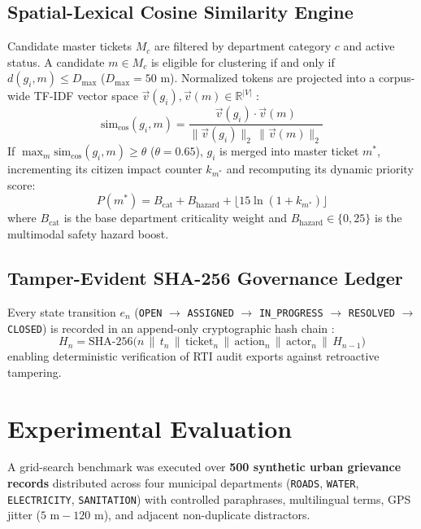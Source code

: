 \documentclass[conference]{IEEEtran}
\begin{document}
\subsection{Spatial-Lexical Cosine Similarity Engine}
Candidate master tickets $M_c$ are filtered by department category $c$ and active status. A candidate $m \in M_c$ is eligible for clustering if and only if $d(g_i, m) \le D_{\max}$ ($D_{\max} = 50\text{ m}$). Normalized tokens are projected into a corpus-wide TF-IDF vector space $\vec{v}(g_i), \vec{v}(m) \in \mathbb{R}^{|V|}$ \cite{salton1988term, ramos2003using, manning2008introduction}:
\begin{equation}
\text{sim}_{\text{cos}}(g_i, m) = \frac{\vec{v}(g_i) \cdot \vec{v}(m)}{\|\vec{v}(g_i)\|_2 \, \|\vec{v}(m)\|_2}
\end{equation}
If $\max_{m} \text{sim}_{\text{cos}}(g_i, m) \ge \theta$ ($\theta = 0.65$), $g_i$ is merged into master ticket $m^*$, incrementing its citizen impact counter $k_{m^*}$ and recomputing its dynamic priority score:
\begin{equation}
P(m^*) = B_{\text{cat}} + B_{\text{hazard}} + \lfloor 15 \ln(1 + k_{m^*}) \rfloor
\end{equation}
where $B_{\text{cat}}$ is the base department criticality weight and $B_{\text{hazard}} \in \{0, 25\}$ is the multimodal safety hazard boost.

\subsection{Tamper-Evident SHA-256 Governance Ledger}
Every state transition $e_n$ (\texttt{OPEN} $\rightarrow$ \texttt{ASSIGNED} $\rightarrow$ \texttt{IN\_PROGRESS} $\rightarrow$ \texttt{RESOLVED} $\rightarrow$ \texttt{CLOSED}) is recorded in an append-only cryptographic hash chain \cite{nakamoto2008bitcoin}:
\begin{equation}
H_n = \text{SHA-256}\big(n \,\|\, t_n \,\|\, \text{ticket}_n \,\|\, \text{action}_n \,\|\, \text{actor}_n \,\|\, H_{n-1}\big)
\end{equation}
enabling deterministic verification of RTI audit exports against retroactive tampering.

\section{Experimental Evaluation}
A grid-search benchmark was executed over \textbf{500 synthetic urban grievance records} distributed across four municipal departments (\texttt{ROADS}, \texttt{WATER}, \texttt{ELECTRICITY}, \texttt{SANITATION}) with controlled paraphrases, multilingual terms, GPS jitter ($5\text{ m} - 120\text{ m}$), and adjacent non-duplicate distractors.
\end{document}

